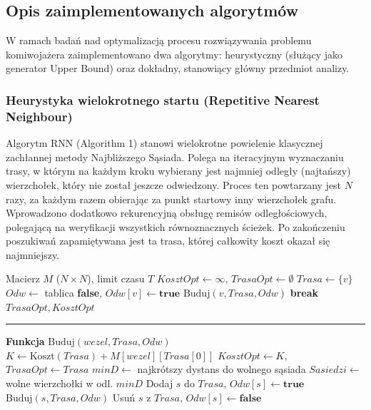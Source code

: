 \documentclass[conference]{IEEEtran}
\begin{document}
        \subsection{Opis zaimplementowanych algorytmów}
            W ramach badań nad optymalizacją procesu rozwiązywania problemu komiwojażera zaimplementowano dwa algorytmy: heurystyczny (służący jako generator Upper Bound) oraz dokładny, stanowiący główny przedmiot analizy.
            \subsubsection{Heurystyka wielokrotnego startu (Repetitive Nearest Neighbour)}
                Algorytm RNN (Algorithm 1) stanowi wielokrotne powielenie klasycznej zachłannej metody Najbliższego Sąsiada. Polega na iteracyjnym wyznaczaniu trasy, w którym na każdym kroku wybierany jest najmniej odległy (najtańszy) wierzchołek, który nie został jeszcze odwiedzony. Proces ten powtarzany jest $N$ razy, za każdym razem obierając za punkt startowy inny wierzchołek grafu. Wprowadzono dodatkowo rekurencyjną obsługę remisów odległościowych, polegającą na weryfikacji wszystkich równoznacznych ścieżek. Po zakończeniu poszukiwań zapamiętywana jest ta trasa, której całkowity koszt okazał się najmniejszy.
                \begin{algorithm}
                    \caption{Repetitive Nearest Neighbour z obsługą remisów}
                    \begin{algorithmic}[1]
                    \REQUIRE Macierz $M$ ($N \times N$), limit czasu $T$
                    \STATE $KosztOpt \leftarrow \infty$, $TrasaOpt \leftarrow \emptyset$
                        \STATE $Trasa \leftarrow \{v\}$
                        \STATE $Odw \leftarrow$ tablica \textbf{false}, $Odw[v] \leftarrow \textbf{true}$
                        \STATE $\text{Buduj}(v, Trasa, Odw)$
                         \STATE \textbf{break} \ENDIF
                    \ENDFOR
                    \RETURN $TrasaOpt, KosztOpt$
                    \vspace{0.15cm}\hrule\vspace{0.15cm}
                    \STATE \textbf{Funkcja} $\text{Buduj}(wezel, Trasa, Odw)$
                        \STATE $K \leftarrow \text{Koszt}(Trasa) + M[wezel][Trasa[0]]$
                            \STATE $KosztOpt \leftarrow K$, $TrasaOpt \leftarrow Trasa$
                        \ENDIF
                        \RETURN
                    \ENDIF
                    \STATE $minD \leftarrow$ najkrótszy dystans do wolnego sąsiada
                    \STATE $Sasiedzi \leftarrow$ wolne wierzchołki w odl. $minD$
                        \STATE Dodaj $s$ do $Trasa$, $Odw[s] \leftarrow \textbf{true}$
                        \STATE $\text{Buduj}(s, Trasa, Odw)$
                        \STATE Usuń $s$ z $Trasa$, $Odw[s] \leftarrow \textbf{false}$
                    \ENDFOR
                    \end{algorithmic}
                \end{algorithm}
\end{document}
